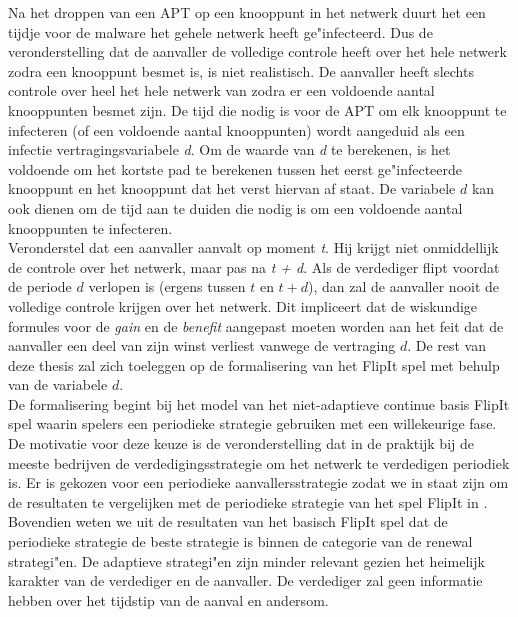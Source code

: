 \documentclass[master=cws, masteroption=vs,english]{kulemt}
\begin{document}
\begin{abstract*}
Na het droppen van een APT op een knooppunt in het netwerk duurt het een tijdje voor de malware het gehele netwerk heeft ge"infecteerd. Dus de veronderstelling dat de aanvaller de volledige controle heeft over het hele netwerk zodra een knooppunt besmet is, is niet realistisch. De aanvaller heeft slechts controle over heel het hele netwerk van zodra er een voldoende aantal knooppunten besmet zijn.
De tijd die nodig is voor de APT om elk knooppunt te infecteren (of een voldoende aantal knooppunten) wordt
aangeduid als een infectie vertragingsvariabele \textit{d}. Om de waarde van \textit{d} te berekenen, is het voldoende om het kortste pad te berekenen tussen het eerst ge"infecteerde knooppunt en het knooppunt dat het verst hiervan af staat. De variabele $ d $ kan ook dienen om de tijd aan te duiden die nodig is om een voldoende aantal knooppunten te infecteren.\\

Veronderstel dat een aanvaller aanvalt op moment \textit {t}. Hij krijgt niet onmiddellijk de controle over het netwerk, maar pas na \textit {t + d}. Als de verdediger flipt voordat de periode $d$ verlopen is (ergens tussen $t$ en $t+d$), dan zal de aanvaller nooit de volledige controle krijgen over het netwerk. Dit impliceert dat de wiskundige formules voor de \textit{gain} en de \textit{benefit} aangepast moeten worden aan het feit dat de aanvaller een deel van zijn winst verliest vanwege de vertraging $d$. De rest van deze thesis zal zich toeleggen op de formalisering van het FlipIt spel met behulp van de variabele $ d $. \\


De formalisering begint bij het model van het niet-adaptieve continue basis FlipIt spel waarin spelers een periodieke strategie gebruiken met een willekeurige fase. De motivatie voor deze keuze is de veronderstelling dat in de praktijk bij de meeste bedrijven de verdedigingsstrategie om het netwerk te verdedigen periodiek is. Er is gekozen voor een periodieke aanvallersstrategie zodat we in staat zijn om de resultaten te vergelijken met de periodieke strategie van het spel FlipIt in \citep{FlipIt}. Bovendien weten we uit de resultaten van het basisch FlipIt spel dat de periodieke strategie de beste strategie is binnen de categorie van de renewal strategi"en. De adaptieve strategi"en zijn minder relevant gezien het heimelijk karakter van de verdediger en de aanvaller. De verdediger zal geen informatie hebben over het tijdstip van de aanval en andersom.\\%



\end{abstract*}
\end{document}
